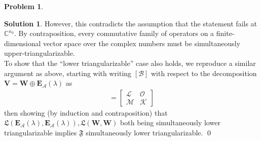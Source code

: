 \documentclass{book}
\theoremstyle{definition}
\newtheorem*{prob*}{Problem}
\newtheorem*{sln*}{Solution}
\newcommand{\V}{\mathbf{V}}
\newcommand{\W}{\mathbf{W}}
\newcommand{\A}{\mathcal{A}}
\newcommand{\B}{\mathcal{B}}
\newcommand{\lag}{\mathcal{L}}
\newcommand{\M}{\mathcal{M}}
\newcommand{\K}{\mathcal{K}}
\newcommand{\FF}{\mathfrak{F}}
\newcommand{\LL}{\mathfrak{L}}
\begin{document}
\begin{prob*}
\begin{sln*}
	However, this contradicts the assumption that the statement fails at $\mathbb{C}^{n_0}$. By contraposition, every commutative family of operators on a finite-dimensional vector space over the complex numbers must be simultaneously upper-triangularizable.\\
	
	 To show that the ``lower triangularizable'' case also holds, we reproduce a similar argument as above, starting with writing $[\B]$ with respect to the decomposition $\V = \W \oplus \textbf{E}_\A(\lambda) $ as 
	 \begin{align*}
	 [\B] = \begin{bmatrix}
	 \lag & \mathcal{O}\\
	 \M & \K
	 \end{bmatrix}
	 \end{align*}
	then showing (by induction and contraposition) that $\LL(\textbf{E}_\A(\lambda),\textbf{E}_\A(\lambda)), \LL(\W,\W)$ both being simultaneously lower triangularizable implies $\FF$ simultaneously lower triangularizable.  \qed
	\end{sln*}
	
	

\end{prob*}






\newpage
\end{document}
